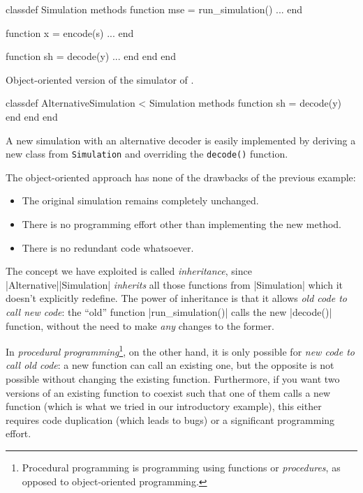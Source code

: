 \begin{listing}
\begin{Code}
  classdef Simulation
    methods
      function mse = run_simulation()
        ... %
      end

      function x = encode(s)
        ...
      end

      function sh = decode(y)
        ...
      end
    end
  end
\end{Code}
  \caption{Object-oriented version of the simulator of .}
  \label{lst:objectsim}
\end{listing}

\begin{listing}
\begin{Code}
  classdef AlternativeSimulation < Simulation
    methods
      function sh = decode(y)
      end
    end 
  end
\end{Code}
  \caption{A new simulation with an alternative decoder is easily implemented by
  deriving a new class from \texttt{Simulation} and overriding the
  \texttt{decode()} function.}
  \label{lst:derivedclass}
\end{listing}

The object-oriented approach has none of the drawbacks of the previous example:
\begin{itemize}
  \item The original simulation remains completely unchanged.
  \item There is no programming effort other than implementing the new method.
  \item There is no redundant code whatsoever.
\end{itemize}

The concept we have exploited is called \emph{inheritance}, since
|Alternative|\-|Simulation| \emph{inherits} all those functions from
|Simulation| which it doesn't explicitly redefine.  The power of
inheritance is that it allows \emph{old code to call new code}: the
``old'' function |run_simulation()| calls the new |decode()| function, without
the need to make \emph{any} changes to the former. 

In \emph{procedural programming}\footnote{Procedural programming is programming
using functions or \emph{procedures}, as opposed to object-oriented
programming.}, on the other hand, it is only possible for \emph{new code to call old code}: a new
function can call an existing one, but the opposite is not possible without
changing the existing function.  Furthermore, if you want two versions of an
existing function to coexist such that one of them calls a new function (which
is what we tried in our introductory example), this either requires code
duplication (which leads to bugs) or a significant programming effort. 

